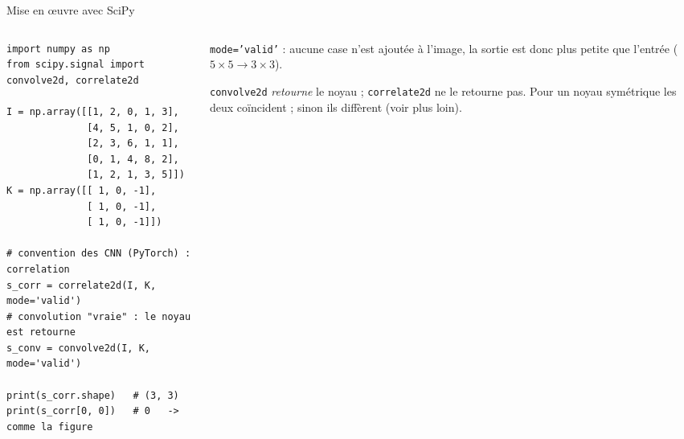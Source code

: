 \begin{frame}[fragile]{Mise en œuvre avec SciPy}
\begin{columns}[t]
\begin{column}{0.55\textwidth}
\begin{codebox}
\begin{lstlisting}
import numpy as np
from scipy.signal import convolve2d, correlate2d

I = np.array([[1, 2, 0, 1, 3],
              [4, 5, 1, 0, 2],
              [2, 3, 6, 1, 1],
              [0, 1, 4, 8, 2],
              [1, 2, 1, 3, 5]])
K = np.array([[ 1, 0, -1],
              [ 1, 0, -1],
              [ 1, 0, -1]])

# convention des CNN (PyTorch) : correlation
s_corr = correlate2d(I, K, mode='valid')
# convolution "vraie" : le noyau est retourne
s_conv = convolve2d(I, K, mode='valid')

print(s_corr.shape)   # (3, 3)
print(s_corr[0, 0])   # 0   -> comme la figure
\end{lstlisting}
\end{codebox}
\end{column}
\begin{column}{0.42\textwidth}
\begin{kbox}
\texttt{mode='valid'} : aucune case n'est ajoutée à l'image, la sortie est donc plus
petite que l'entrée ($5 \times 5 \to 3 \times 3$).
\end{kbox}
\begin{wbox}[Attention]
\texttt{convolve2d} \emph{retourne} le noyau ; \texttt{correlate2d} ne le retourne pas.
Pour un noyau symétrique les deux coïncident ; sinon ils diffèrent (voir plus loin).
\end{wbox}
\end{column}
\end{columns}
\end{frame}

